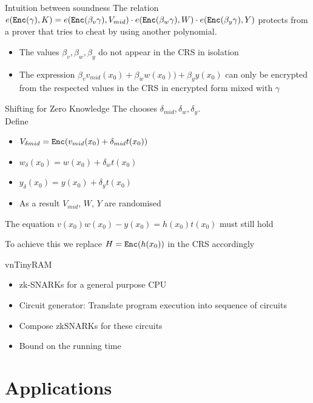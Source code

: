 \documentclass[handout]{beamer}
\begin{document}
\begin{frame}{Intuition between soundness}
The relation 
$e(\mathtt{Enc}(\gamma),K) = e(\mathtt{Enc}(\beta_v \gamma),V_{mid}) \cdot e(\mathtt{Enc}(\beta_w \gamma),W) \cdot e(\mathtt{Enc}(\beta_y \gamma),Y)$
protects from a prover that tries to cheat by using another polynomial.
\begin{itemize}
    \item The values $\beta_v, \beta_w, \beta_y$ do not appear in the CRS in isolation
    \item The expression $\beta_v v_{mid}(x_0) + \beta_w w(x_0))+\beta_y y(x_0) $ can only be encrypted from the respected values in the CRS in encrypted form mixed with $\gamma$
\end{itemize}
\end{frame}

\begin{frame}{Shifting for Zero Knowledge}
The \prv chooses $\delta_{mid}, \delta_w, \delta_y$. \\
Define 
\begin{itemize}
\item $V_{\delta{mid}} = \mathtt{Enc}(v_{mid}(x_0)+\delta_{mid}t(x_0))$
\item $w_{\delta}(x_0) = w(x_0)+\delta_w t(x_0)$
\item $y_{\delta}(x_0) = y(x_0)+\delta_y t(x_0)$
\item As a result $V_{mid}$, $W$, $Y$ are randomised
\end{itemize}
The equation $v(x_0)w(x_0)-y(x_0)= h(x_0)t(x_0)$ must still hold

To achieve this we replace $H = \mathtt{Enc}(h(x_0))$ in the CRS accordingly

\end{frame}

\begin{frame}{vnTinyRAM}
\begin{itemize}
    \item zk-SNARKs for a general purpose CPU
    \item Circuit generator: Translate program execution into sequence of circuits
    \item Compose zkSNARKs for these circuits
    \item Bound on the running time
\end{itemize}
\end{frame}

\section{Applications}
\end{document}

